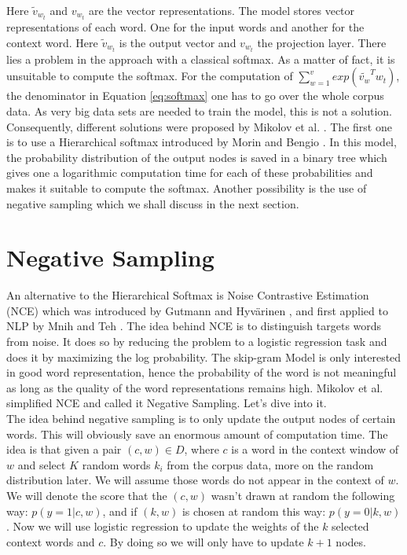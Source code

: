   Here $\tilde{v}_{w_t}$ and $ v_{w_t}$ are the vector representations. The model stores vector representations of each word. One for the input words and another for the context word. Here $\tilde{v}_{w_t}$ is the output vector and  $ v_{w_t}$ the projection layer. There lies a problem in the approach with a classical softmax. As a matter of fact, it is unsuitable to compute the softmax. For the computation of $\sum_{w=1}^v exp(\tilde{v_w}^T w_t)$, the denominator in Equation \ref{eq:softmax} one has to go over the whole corpus data. As very big data sets are needed to train the model, this is not a solution. Consequently, different solutions were proposed by Mikolov et al. \cite{mikolov2}. The first one is to use a Hierarchical softmax introduced by Morin and Bengio \cite{hsoftmax}. In this model, the probability distribution of the output nodes is saved in a binary tree which gives one a logarithmic computation time for each of these probabilities and makes it suitable to compute the softmax. Another possibility is the use of negative sampling which we shall discuss in the next section. 

\section{Negative Sampling}
An alternative to the Hierarchical Softmax is Noise Contrastive Estimation (NCE) which was introduced by Gutmann and Hyv{\"a}rinen \cite{nce-original},  and first applied to NLP by Mnih and Teh \cite{mnih}. The idea behind NCE is to distinguish targets words from noise. It does so by reducing the problem to a logistic regression task and does it by maximizing the log probability. The skip-gram Model is only interested in good word representation, hence the probability of the word is not meaningful as long as the quality of the word representations remains high. Mikolov et al. \cite{mikolov2} simplified NCE and called it Negative Sampling. Let's dive into it.\\
The idea behind negative sampling is to only update the output nodes of certain words. This will obviously save an enormous amount of computation time. The idea is that given a pair $(c,w) \in D$, where $c$ is a word in the context window of $w$ and select $K$ random words $k_i$ from the corpus data, more on the random distribution later. We will assume those words do not appear in the context of $w$. We will denote the score that the $(c,w)$ wasn't drawn at random the following way: $p(y=1|c,w)$, and if $(k,w) $ is chosen at random this way: $p(y=0|k,w)$.  Now we will use logistic regression to update the weights of the $k$ selected context words and $c$. By doing so we will only have to update $k+1$ nodes.

